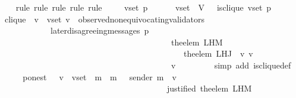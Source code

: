 \begin{isabellebody}
%
\isadelimproof
\ \ %
\endisadelimproof
%
\isatagproof
{}\isamarkupfalse%
\ {\isacharparenleft}rule{\isacharcomma}\ rule{\isacharcomma}\ rule{\isacharcomma}\ rule{\isacharcomma}\ rule{\isacharparenright}\isanewline
{}\isamarkupfalse%
{\isacharminus}\isanewline
\ \ \isamarkupfalse%
\ {\isasymsigma}\ v{\isacharunderscore}set\ p\ \isamarkupfalse%
\ {\isachardoublequoteopen}{\isasymsigma}\ {\isasymin}\ {\isasymSigma}\ {\isasymand}\ v{\isacharunderscore}set\ {\isasymsubseteq}\ V{\isachardoublequoteclose}\ \ \ {\isachardoublequoteopen}is{\isacharunderscore}clique\ {\isacharparenleft}v{\isacharunderscore}set{\isacharcomma}\ p{\isacharcomma}\ {\isasymsigma}{\isacharparenright}{\isachardoublequoteclose}\ \isanewline
\ \ \isamarkupfalse%
\ \isamarkupfalse%
\ clique{\isacharcolon}\ {\isachardoublequoteopen}{\isasymforall}\ v\ {\isasymin}\ v{\isacharunderscore}set{\isachardot}\ v\ {\isasymin}\ observed{\isacharunderscore}non{\isacharunderscore}equivocating{\isacharunderscore}validators\ {\isasymsigma}\ \ \isanewline
\ \ \ \ \ \ \ \ \ \ \ {\isasymand}\ later{\isacharunderscore}disagreeing{\isacharunderscore}messages\ {\isacharparenleft}p{\isacharcomma}\isanewline
\ \ \ \ \ \ \ \ \ \ \ \ \ \ \ \ \ \ \ \ \ \ \ \ \ \ \ \ \ \ \ \ \ \ \ \ \ \ \ \ \ the{\isacharunderscore}elem\ {\isacharparenleft}L{\isacharunderscore}H{\isacharunderscore}M\ \isanewline
\ \ \ \ \ \ \ \ \ \ \ \ \ \ \ \ \ \ \ \ \ \ \ \ \ \ \ \ \ \ \ \ \ \ \ \ \ \ \ \ \ \ \ \ {\isacharparenleft}the{\isacharunderscore}elem\ {\isacharparenleft}L{\isacharunderscore}H{\isacharunderscore}J\ {\isasymsigma}\ v{\isacharparenright}{\isacharparenright}\ v{\isacharparenright}\isanewline
\ \ \ \ \ \ \ \ \ \ \ \ \ \ \ \ \ \ \ \ \ \ \ \ \ \ \ \ \ \ \ \ \ \ \ \ \ \ \ \ {\isacharcomma}\ v{\isacharcomma}\ {\isasymsigma}{\isacharparenright}\ {\isacharequal}\ {\isasymemptyset}{\isachardoublequoteclose}\isanewline
\ \ \ \ \isamarkupfalse%
\ {\isacharparenleft}simp\ add{\isacharcolon}\ is{\isacharunderscore}clique{\isacharunderscore}def{\isacharparenright}\ \isanewline
\ \ \isamarkupfalse%
\ \isamarkupfalse%
\ p{\isacharunderscore}on{\isacharunderscore}est\ {\isacharcolon}\ {\isachardoublequoteopen}{\isasymforall}\ v\ {\isasymin}\ v{\isacharunderscore}set{\isachardot}\ {\isacharparenleft}{\isasymforall}\ m\ {\isasymin}\ {\isacharbraceleft}m{\isacharprime}\ {\isasymin}\ {\isasymsigma}{\isachardot}\ sender\ m{\isacharprime}\ {\isacharequal}\ v\ \isanewline
\ \ \ \ \ \ \ \ \ \ \ \ \ \ \ \ \ \ \ \ \ \ \ \ \ \ \ \ \ \ \ \ \ \ \ \ \ \ \ {\isasymand}\ justified\ {\isacharparenleft}the{\isacharunderscore}elem\ {\isacharparenleft}L{\isacharunderscore}H{\isacharunderscore}M\ \isanewline

\end{isabellebody}
